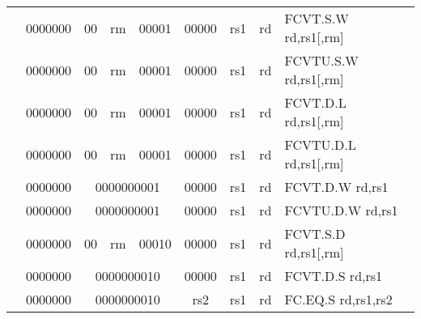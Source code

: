 \begin{table}[p]
\begin{small}
\begin{center}
\begin{tabular}{rcccccccccl}
&
\multicolumn{1}{|c|}{0000000} &
\multicolumn{1}{c|}{00} &
\multicolumn{2}{c|}{rm} &
\multicolumn{2}{c|}{00001} &
\multicolumn{1}{c|}{00000} &
\multicolumn{1}{c|}{rs1} &
\multicolumn{1}{c|}{rd} & FCVT.S.W rd,rs1[,rm] \\
\cline{2-10}
  

&
\multicolumn{1}{|c|}{0000000} &
\multicolumn{1}{c|}{00} &
\multicolumn{2}{c|}{rm} &
\multicolumn{2}{c|}{00001} &
\multicolumn{1}{c|}{00000} &
\multicolumn{1}{c|}{rs1} &
\multicolumn{1}{c|}{rd} & FCVTU.S.W rd,rs1[,rm] \\
\cline{2-10}
  

&
\multicolumn{1}{|c|}{0000000} &
\multicolumn{1}{c|}{00} &
\multicolumn{2}{c|}{rm} &
\multicolumn{2}{c|}{00001} &
\multicolumn{1}{c|}{00000} &
\multicolumn{1}{c|}{rs1} &
\multicolumn{1}{c|}{rd} & FCVT.D.L rd,rs1[,rm] \\
\cline{2-10}
  

&
\multicolumn{1}{|c|}{0000000} &
\multicolumn{1}{c|}{00} &
\multicolumn{2}{c|}{rm} &
\multicolumn{2}{c|}{00001} &
\multicolumn{1}{c|}{00000} &
\multicolumn{1}{c|}{rs1} &
\multicolumn{1}{c|}{rd} & FCVTU.D.L rd,rs1[,rm] \\
\cline{2-10}
  

&
\multicolumn{1}{|c|}{0000000} &
\multicolumn{5}{c|}{0000000001} &
\multicolumn{1}{c|}{00000} &
\multicolumn{1}{c|}{rs1} &
\multicolumn{1}{c|}{rd} & FCVT.D.W rd,rs1 \\
\cline{2-10}
  

&
\multicolumn{1}{|c|}{0000000} &
\multicolumn{5}{c|}{0000000001} &
\multicolumn{1}{c|}{00000} &
\multicolumn{1}{c|}{rs1} &
\multicolumn{1}{c|}{rd} & FCVTU.D.W rd,rs1 \\
\cline{2-10}
  

&
\multicolumn{1}{|c|}{0000000} &
\multicolumn{1}{c|}{00} &
\multicolumn{2}{c|}{rm} &
\multicolumn{2}{c|}{00010} &
\multicolumn{1}{c|}{00000} &
\multicolumn{1}{c|}{rs1} &
\multicolumn{1}{c|}{rd} & FCVT.S.D rd,rs1[,rm] \\
\cline{2-10}
  

&
\multicolumn{1}{|c|}{0000000} &
\multicolumn{5}{c|}{0000000010} &
\multicolumn{1}{c|}{00000} &
\multicolumn{1}{c|}{rs1} &
\multicolumn{1}{c|}{rd} & FCVT.D.S rd,rs1 \\
\cline{2-10}
  

&
\multicolumn{1}{|c|}{0000000} &
\multicolumn{5}{c|}{0000000010} &
\multicolumn{1}{c|}{rs2} &
\multicolumn{1}{c|}{rs1} &
\multicolumn{1}{c|}{rd} & FC.EQ.S rd,rs1,rs2 \\
\cline{2-10}
  


\end{tabular}
\end{center}
\end{small}
\end{table}
